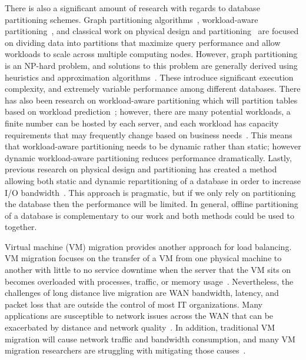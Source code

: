 There is also a significant amount of research with regards to database partitioning schemes. Graph partitioning algorithms~\cite{Karypis:1998:FHQ:305219.305248}, workload-aware partitioning~\cite{Scholl:2009:WDP:1516360.1516366}, and classical work on physical design and partitioning~\cite{Zilio:1998:PDD:928651} are focused on dividing data into partitions that maximize query performance and allow workloads to scale across multiple computing nodes. However, graph partitioning is an NP-hard problem, and solutions to this problem are generally derived using heuristics and approximation algorithms~\cite{citeulike:11192678}. These introduce significant execution complexity, and extremely variable performance among different databases. There has also been research on workload-aware partitioning which will partition tables based on workload prediction~\cite{Scholl:2009:WDP:1516360.1516366, Mit-Shinobi}; however, there are many potential workloads, a finite number can be hosted by each server, and each workload has capacity requirements that may frequently change based on business needs~\cite{Gmach:2007:WAD:1524302.1524818}. This means that workload-aware partitioning needs to be dynamic rather than static; however dynamic workload-aware partitioning reduces performance dramatically. Lastly, previous research on physical design and partitioning has created a method allowing both static and dynamic repartitioning of a database in order to increase I/O bandwidth~\cite{Zilio:1998:PDD:928651}. This approach is pragmatic, but if we only rely on partitioning the database then the performance will be limited. In general, offline partitioning of a database is complementary to our work and both methods could be used to together.
 
Virtual machine (VM) migration provides another approach for load balancing. VM migration focuses on the transfer of a VM from one physical machine to another with little to no service downtime when the server that the VM sits on becomes overloaded with processes, traffic, or memory usage~\cite{Clark:2005:LMV:1251203.1251223}. Nevertheless, the challenges of long distance live migration are WAN bandwidth, latency, and packet loss that are outside the control of most IT organizations. Many applications are susceptible to network issues across the WAN that can be exacerbated by distance and network quality~\cite{murphyVMWare}. In addition, traditional VM migration will cause network traffic and bandwidth consumption, and many VM migration researchers are struggling with mitigating those causes~\cite{Liu:2009:LMV:1551609.1551630}.
